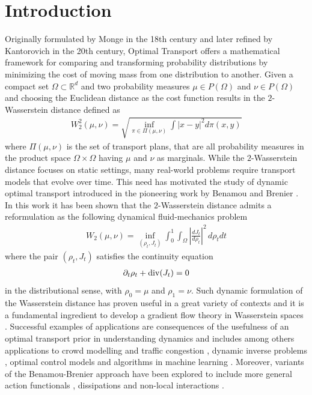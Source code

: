\documentclass{article}
\def\R{{\mathbb R}}
\begin{document}
\section{Introduction}
Originally formulated by Monge in the 18th century and later refined by Kantorovich in the 20th century, Optimal Transport offers a mathematical framework for comparing and transforming probability distributions by minimizing the cost of moving mass from one distribution to another. 
Given a compact set $\Omega \subset \R^d$ and two probability measures $\mu \in P(\Omega)$ and $\nu \in P(\Omega)$ and choosing the Euclidean distance as the cost function results in the 
$2$-Wasserstein distance defined as  
\begin{align}
    W_2^2(\mu,\nu) = \sqrt{\inf_{\pi \in \Pi(\mu,\nu)} \int |x-y|^2 d\pi(x,y)}
\end{align}
where $\Pi(\mu,\nu)$ is the set of transport plans, that are all probability measures in the product space $\Omega\times \Omega$ having $\mu$ and $\nu$ as marginals. 
While the $2$-Wasserstein distance focuses on static settings, many real-world problems require transport models that evolve over time. This need has motivated the study of dynamic optimal transport introduced in the pioneering work by Benamou and Brenier \cite{benamou2000computational}. In this work it has been shown that the $2$-Wasserstein distance admits a reformulation as the following
dynamical fluid-mechanics problem  
\begin{align}
    W_2(\mu,\nu) = \inf_{(\rho_t, J_t)} \int_0^1\int_{\Omega}  \left|\frac{dJ_t}{d\rho_t}\right|^2\, d\rho_t dt
\end{align}
where the pair $(\rho_t, J_t)$ satisfies the continuity equation
\begin{align}
    \partial_t \rho_t + {\rm div}(J_t) = 0
\end{align}
in the distributional sense, with $\rho_{0} = \mu$ and $\rho_{1} = \nu$. Such dynamic formulation of the Wasserstein distance has proven useful in a great variety of contexts and it is a fundamental ingredient to develop a gradient flow theory in Wasserstein spaces \cite{Otto2001,JKO98,AGS2008}. Successful examples of applications are consequences of the usefulness of an optimal transport prior in understanding dynamics and includes among others applications to crowd modelling and traffic congestion \cite{maury2010macroscopic, carlier2008optimal, stephanovitch2024optimal}, dynamic inverse problems \cite{schmitzer2019dynamic, bredies2020optimal, bredies2023generalized, dawood2010continuity}, optimal control models and algorithms in machine learning \cite{onken2021ot}. 
Moreover, variants of the Benamou-Brenier approach have been explored to include more general action functionals \cite{Dolbeault_2008, Lisini2010, Carrillo2010}, dissipations \cite{chizat2018unbalanced, liero2018optimal, kondratyev2016new} and non-local interactions \cite{slepvcev2023nonlocal}.
\end{document}
